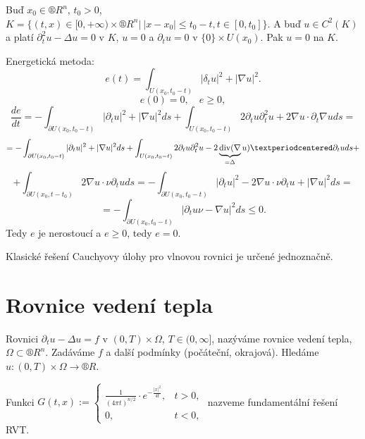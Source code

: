 \documentclass[12pt]{article}					%
\begin{document}

\begin{veta}
	Buď $x_0 \in ®R^n$, $t_0 > 0$, $K = \{(t, x) \in [0, +∞) \times ®R^n |\ |x - x_0| ≤ t_0 - t, t \in [0, t_0]\}$. A buď $u \in C^2(K)$ a platí $\partial_t^2 u - \Delta u = 0$ v $K$, $u = 0$ a $\partial_t u = 0$ v $\{0\} \times U(x_0)$. Pak $u = 0$ na $K$.

	\begin{dukazin}
		Energetická metoda:
		$$ e(t) = \int_{U(x_0, t_0 - t)} |\delta_t u|^2 + |\nabla u|^2. $$
		$$ e(0) = 0, \quad e ≥ 0, $$
		$$ \frac{de}{dt} = - \int_{\partial U(x_0, t_0 - t)}|\partial_t u|^2 + |\nabla u|^2 ds + \int_{U(x_0, t_0 - t)} 2 \partial_t u \partial_t^2 u + 2 \nabla u · \partial_t \nabla u ds = $$
		$$ = - \int_{\partial U(x_0, t_0 - t)}|\partial_t u|^2 + |\nabla u|^2 ds + \int_{U(x_0, t_0 - t)} 2 \partial_t u \partial_t^2 u - 2 \underbrace{\Div(\nabla}_{=\Delta} u) · \partial_t u ds + $$
		$$ + \int_{\partial U(x_0, t - t_0)} 2 \nabla u·\nu \partial_t u ds = - \int_{\partial U(x_0, t_0 - t)}|\partial_t u|^2 - 2\nabla u · \nu \partial_t u + |\nabla u|^2 ds = $$
		$$ = - \int_{\partial U(x_0, t_0 - t)}|\partial_t u \nu - \nabla u|^2 ds ≤ 0. $$
		Tedy $e$ je nerostoucí a $e ≥ 0$, tedy $e = 0$.
	\end{dukazin}
\end{veta}

\begin{dusledek}
	Klasické řešení Cauchyovy úlohy pro vlnovou rovnici je určené jednoznačně.
\end{dusledek}

\section{Rovnice vedení tepla}
\begin{definice}
	Rovnici $\partial_t u - \Delta u = f$ v $(0, T) \times \Omega$, $T \in (0, ∞]$, nazýváme rovnice vedení tepla, $\Omega \subset ®R^n$. Zadáváme $f$ a další podmínky (počáteční, okrajová). Hledáme $u: (0, T) \times \Omega \rightarrow ®R$.
\end{definice}

\begin{definice}
	Funkci $G(t, x) := \begin{cases}\frac{1}{(4\pi t)^{n / 2}}·e^{-\frac{|x|^2}{4t}}, & t > 0,\\0, & t < 0,\end{cases}$ nazveme fundamentální řešení RVT.
\end{definice}
\end{document}
